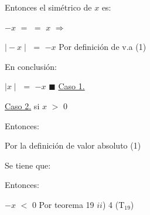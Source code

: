 \documentclass[12pt]{article}
\renewcommand{\qedsymbol}{$\blacksquare$}
\begin{document}
{\textcolor{palatinateblue}{Entonces el simétrico de} $x$} {\textcolor{palatinateblue}{es:}} \vspace{0.5cm}

$-x$ $=$ {\textcolor{vividviolet}{{}}} $=$ $x$ $\Longrightarrow$ {\textcolor{vividviolet}{{}}} \vspace{0.5cm}

\hspace{4.5cm} $\mid -x \mid$ $=$ $-x$ \hspace{2.5cm} {\textcolor{carrotorange}{Por definición de v.a (1)}} \vspace{0.5cm}

{\textcolor{palatinateblue}{En conclusión:}} \vspace{0.5cm}

\hspace{4.8cm} $\mid x \mid$ $=$ $-x$ \hspace{0.3cm} {\textcolor{carrotorange}{\qedsymbol}} \hspace{0.1cm} {\textcolor{palatinateblue}{\underline{Caso 1.}}} \vspace{1cm}

{\textcolor{palatinateblue}{{\underline{Caso 2.}} }} si {\Large{$x$ $>$ $0$}}\vspace{0.5cm}

{\textcolor{palatinateblue}{Entonces:}} \vspace{0.5cm}

{\textcolor{carrotorange}{Por la definición de valor absoluto (1)}} \vspace{0.5cm}

{\textcolor{palatinateblue}{Se tiene que:}} \vspace{0.5cm}

\hspace{4.8cm} {\textcolor{vividviolet}{{}}} \vspace{0.5cm}  

{\textcolor{palatinateblue}{Entonces:}} \vspace{0.5cm}

\hspace{5cm} $-x$ $<$ $0$ \hspace{1.9cm} {\textcolor{carrotorange}{Por teorema 19 $ii$) 4 (T$_{19}$)}} \vspace{0.5cm}
\end{document}
